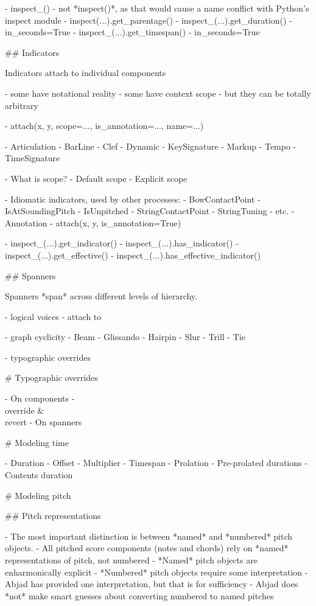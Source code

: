 \begin{markdown}
-   inspect_()
-   not *inspect()*, as that would cause a name conflict with Python's inspect
    module
-   inspect(...).get_parentage()
-   inspect_(...).get_duration()
    -   in_seconds=True
-   inspect_(...).get_timespan()
    -   in_seconds=True

## Indicators

Indicators attach to individual components

-   some have notational reality
-   some have context scope
-   but they can be totally arbitrary

-   attach(x, y, scope=..., is_annotation=..., name=...)

-   Articulation
-   BarLine
-   Clef
-   Dynamic
-   KeySignature
-   Markup
-   Tempo
-   TimeSignature

-   What is scope?
-   Default scope
-   Explicit scope

-   Idiomatic indicators, used by other processes:
    -   BowContactPoint
    -   IsAtSoundingPitch
    -   IsUnpitched
    -   StringContactPoint
    -   StringTuning
    -   etc.
-   Annotation
-   attach(x, y, is_annotation=True)

-   inspect_(...).get_indicator()
-   inspect_(...).has_indicator()
-   inspect_(...).get_effective()
-   inspect_(...).has_effective_indicator()

## Spanners

Spanners *span* across different levels of hierarchy.

-   logical voices
-   attach to  

-   graph cyclicity
-   Beam
-   Glissando
-   Hairpin
-   Slur
-   Trill
-   Tie

-   typographic overrides

# Typographic overrides

-   On components
    - \\override & \\revert
-   On spanners

# Modeling time

-   Duration
-   Offset
-   Multiplier
-   Timespan
-   Prolation
-   Pre-prolated durations
-   Contents duration

# Modeling pitch

## Pitch representations

-   The most important distinction is between *named* and *numbered* pitch
    objects.
-   All pitched score components (notes and chords) rely on *named*
    representations of pitch, not numbered
-   *Named* pitch objects are enharmonically explicit
-   *Numbered* pitch objects require some interpretation
-   Abjad has provided one interpretation, but that is for sufficiency
-   Abjad does *not* make smart guesses about converting numbered to named
    pitches


\end{markdown}
